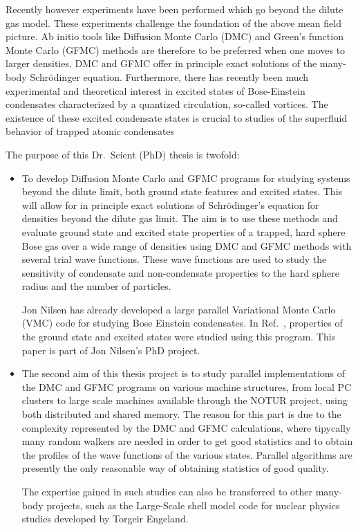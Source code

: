Recently however experiments have been performed which go beyond the dilute gas model.
These experiments challenge the foundation of the above mean field picture.
Ab initio tools like Diffusion Monte Carlo (DMC) and Green's function Monte Carlo 
(GFMC) methods are therefore to be preferred 
when one moves to larger densities. DMC and GFMC offer in principle exact solutions
of the many-body Schr\"odinger equation.
Furthermore, there has  recently been 
much experimental and theoretical interest in excited
states of Bose-Einstein condensates characterized 
by a quantized circulation, so-called vortices.
The existence of these
excited condensate states is crucial to studies of  the superfluid behavior of
trapped atomic condensates

The purpose of this Dr.~Scient (PhD) thesis is twofold:
\begin{itemize}
\item To develop Diffusion Monte Carlo and GFMC programs for studying systems 
beyond the dilute limit, both ground state features and excited states.
This will allow for in principle exact solutions of Schr\"odinger's equation
for densities beyond the dilute gas limit.
The aim is to use these methods and evaluate 
ground state and excited state properties of
a trapped, hard sphere Bose gas over a wide range of densities
using DMC and GFMC  methods with several 
trial wave functions. These wave functions are used 
to study the sensitivity of condensate and 
non-condensate properties to the hard sphere radius and the number 
of particles.

Jon Nilsen has already developed a large parallel Variational 
Monte Carlo (VMC) code for studying Bose Einstein condensates. In Ref.~\cite{jon2005},
properties of the ground state and excited states were studied using this program.
This paper is part of Jon Nilsen's PhD project. 

\item The second aim of this thesis project is to study parallel implementations
of the DMC and GFMC programs 
on various machine structures, from local PC clusters to large scale machines 
available through the NOTUR project, using both
distributed and shared memory. The reason for this part is due to the 
complexity represented
by the DMC and GFMC calculations, where tipycally many random walkers are needed in order
to get good statistics and to obtain the profiles of the wave functions of the
various states. Parallel algorithms are presently the only reasonable way of obtaining
statistics of good quality. 

The expertise gained in such studies can also be transferred to other many-body 
projects, such as the Large-Scale shell model code for nuclear physics studies developed
by Torgeir Engeland. 
\end{itemize}



